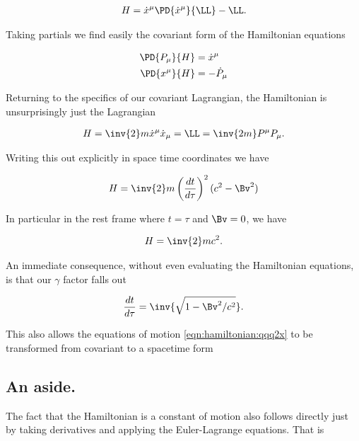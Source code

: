 \begin{align}\label{eqn:hamiltonian:foo2q}
H = \dot{x}^\mu \PD{\dot{x}^\mu}{\LL} -\LL.
\end{align}

Taking partials we find easily the covariant form of the Hamiltonian equations

\begin{align}\label{eqn:hamiltonian:qqq30}
\PD{P_\mu}{H} &= \dot{x}^\mu \\
\PD{x^\mu}{H} &= -\dot{P}_\mu 
\end{align}

Returning to the specifics of our covariant Lagrangian, the Hamiltonian is unsurprisingly just the Lagrangian

\begin{align}\label{eqn:hamiltonian:foo2s}
H = \inv{2} m \dot{x}^\mu \dot{x}_\mu = \LL = \inv{2m} P^\mu P_\mu.
\end{align}

Writing this out explicitly in space time coordinates we have

\begin{align}\label{eqn:hamiltonian:qqq10}
H = \inv{2} m
\left( \frac{dt}{d\tau} \right)^2
(c^2 - \Bv^2)
\end{align}

In particular in the rest frame where $t = \tau$ and $\Bv = 0$, we have

\begin{align}\label{eqn:hamiltonian:qqq11}
H = \inv{2} m c^2.
\end{align}

An immediate consequence, without even evaluating the Hamiltonian equations, is that our $\gamma$ factor falls out

\begin{align}\label{eqn:hamiltonian:qqq12}
\frac{dt}{d\tau} = \inv{\sqrt{1 - \Bv^2/c^2}}.
\end{align}

This also allows the equations of motion \ref{eqn:hamiltonian:qqq2x} to be transformed from covariant to a spacetime form


\subsection{An aside.}

The fact that the Hamiltonian is a constant of motion also follows directly just by taking derivatives and applying the Euler-Lagrange equations.  That is

